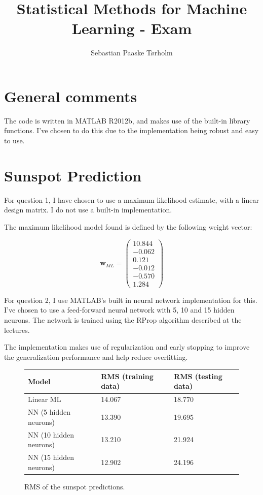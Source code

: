 \documentclass[11pt,a4paper]{article}
\title{Statistical Methods for Machine Learning - Exam}
\author{Sebastian Paaske Tørholm}
\begin{document}
\maketitle

\section{General comments}
The code is written in MATLAB R2012b, and makes use of the built-in library
functions. I've chosen to do this due to the implementation being robust
and easy to use.

\section{Sunspot Prediction}
For question 1, I have chosen to use a maximum likelihood estimate, with a
linear design matrix. I do not use a built-in implementation.

The maximum likelihood model found is defined by the following weight vector:

\[
    \mathbf{w}_{ML} = \begin{pmatrix} 10.844 \\ -0.062 \\ 0.121 \\ -0.012 \\ -0.570 \\ 1.284 \end{pmatrix}
\]


For question 2, I use MATLAB's built in neural network implementation for
this. I've chosen to use a feed-forward neural network with 5, 10 and 15
hidden neurons. The network is trained using the RProp algorithm described at
the lectures.

The implementation makes use of regularization and early stopping to improve
the generalization performance and help reduce overfitting.

\begin{figure}[h!]
    \centering
    \begin{tabular}{|l|l|l|}
        \hline
        Model & RMS (training data) & RMS (testing data) \\
        \hline
        Linear ML & 14.067 & 18.770 \\
        NN (5 hidden neurons) & 13.390 & 19.695 \\
        NN (10 hidden neurons) & 13.210 & 21.924 \\
        NN (15 hidden neurons) & 12.902 & 24.196 \\ 
        \hline
    \end{tabular}
    \label{sunspots-rms}
    \caption{RMS of the sunspot predictions.}
\end{figure}
\end{document}
